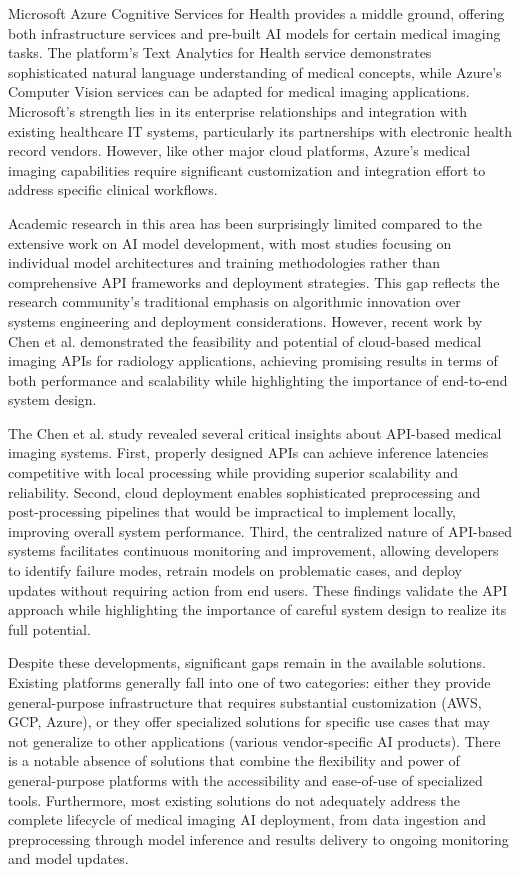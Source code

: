 \documentclass[12pt,a4paper]{article}
\begin{document}
Microsoft Azure Cognitive Services for Health provides a middle ground, offering both infrastructure services and pre-built AI models for certain medical imaging tasks. The platform's Text Analytics for Health service demonstrates sophisticated natural language understanding of medical concepts, while Azure's Computer Vision services can be adapted for medical imaging applications. Microsoft's strength lies in its enterprise relationships and integration with existing healthcare IT systems, particularly its partnerships with electronic health record vendors. However, like other major cloud platforms, Azure's medical imaging capabilities require significant customization and integration effort to address specific clinical workflows.

Academic research in this area has been surprisingly limited compared to the extensive work on AI model development, with most studies focusing on individual model architectures and training methodologies rather than comprehensive API frameworks and deployment strategies. This gap reflects the research community's traditional emphasis on algorithmic innovation over systems engineering and deployment considerations. However, recent work by Chen et al. \cite{chen2021lowdose} demonstrated the feasibility and potential of cloud-based medical imaging APIs for radiology applications, achieving promising results in terms of both performance and scalability while highlighting the importance of end-to-end system design.

The Chen et al. study revealed several critical insights about API-based medical imaging systems. First, properly designed APIs can achieve inference latencies competitive with local processing while providing superior scalability and reliability. Second, cloud deployment enables sophisticated preprocessing and post-processing pipelines that would be impractical to implement locally, improving overall system performance. Third, the centralized nature of API-based systems facilitates continuous monitoring and improvement, allowing developers to identify failure modes, retrain models on problematic cases, and deploy updates without requiring action from end users. These findings validate the API approach while highlighting the importance of careful system design to realize its full potential.

Despite these developments, significant gaps remain in the available solutions. Existing platforms generally fall into one of two categories: either they provide general-purpose infrastructure that requires substantial customization (AWS, GCP, Azure), or they offer specialized solutions for specific use cases that may not generalize to other applications (various vendor-specific AI products). There is a notable absence of solutions that combine the flexibility and power of general-purpose platforms with the accessibility and ease-of-use of specialized tools. Furthermore, most existing solutions do not adequately address the complete lifecycle of medical imaging AI deployment, from data ingestion and preprocessing through model inference and results delivery to ongoing monitoring and model updates.
\end{document}
